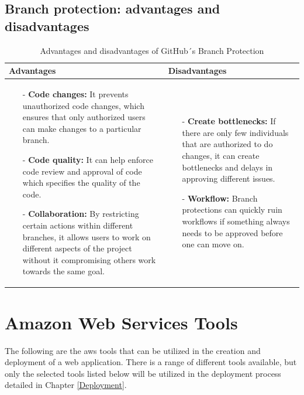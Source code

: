 \subsection{Branch protection: advantages and disadvantages}
\begin{table}[H]
\centering
\begin{tabular}{|>{\raggedright\arraybackslash}p{6cm}|>{\raggedright\arraybackslash}p{6cm}|}
\hline
\textbf{Advantages} & \textbf{Disadvantages} \\
\hline
\begin{itemize}
\item [-] \textbf{Code changes:} It prevents unauthorized code changes, which ensures that only authorized users can make changes to a particular branch.
\item [-]\textbf{Code quality:} It can help enforce code review and approval of code which specifies the quality of the code. 
\item [-] \textbf{Collaboration:} By restricting certain actions within different branches, it allows users to work on different aspects of the project without it compromising others work towards the same goal.  
\end{itemize}
&
   \begin{itemize}
\item [-] \textbf{Create bottlenecks:} If there are only few individuals that are authorized to do changes, it can create bottlenecks and delays in approving different issues. 
\item [-] \textbf{Workflow:} Branch protections can quickly ruin workflows if something always needs to be approved before one can move on. 
    \end{itemize}
    \\
    \hline
    \end{tabular}
    \caption{Advantages and disadvantages of GitHub´s Branch Protection}
    \label{tab: Branch_protection}
    \end{table}
    


\section{Amazon Web Services Tools}

The following are the \acrshort{aws} tools that can be utilized in the creation and deployment of a web application. There is a range of different tools available, but only the selected tools listed below will be utilized in the deployment process detailed in Chapter \ref{Deployment}.

